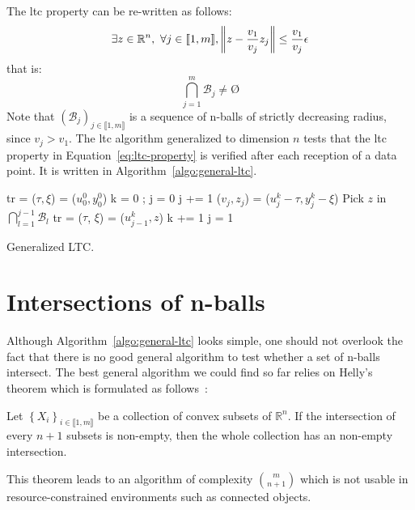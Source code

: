 The \acrshort{ltc} property can be re-written as follows:
\begin{equation}
\exists z \in \mathbb{R}^n, \ \forall j \in \llbracket 1, m \rrbracket, \norm{z-\frac{v_1}{v_j}z_j} \leq
\frac{v_1}{v_j}\epsilon
\end{equation}
that is:
\begin{equation}
\bigcap_{j=1}^m \mathcal{B}_j \neq \text{\O}
\label{eq:ltc-property}
\end{equation}
Note that $(\mathcal{B}_j)_{j \in \llbracket 1, m \rrbracket}$ is a sequence
of n-balls of strictly decreasing radius, since $v_j > v_1$.
The \acrshort{ltc} algorithm generalized to dimension $n$ tests that the
\acrshort{ltc} property in Equation~\ref{eq:ltc-property} is verified after each
reception of a data point. It is written in Algorithm~\ref{algo:general-ltc}.
\begin{algorithm}
\begin{algorithmic}[1]
\Input
\EndInput
\Output
\EndOutput

\State tr = ($\tau, \xi$) = ($u^0_0, y^0_0$) 
\State k = 0 ; j = 0
    \State j += 1
    \State ($v_j, z_j$) = ($u_j^k - \tau, y_j^k - \xi$)
        \State Pick $z$ in $\bigcap_{l=1}^{j-1}{\mathcal{B}_l}$ 
        \State tr = ($\tau$, $\xi$) = ($u^k_{j-1}, z$)
        \State k += 1
        \State j = 1
    \EndIf
\EndWhile
\end{algorithmic}
\caption{Generalized LTC.}
\label{algo:general-ltc}
\end{algorithm}

\section{Intersections of n-balls}

Although Algorithm~\ref{algo:general-ltc} looks simple, one should not overlook
the fact that there is no good general algorithm to test whether a set of
n-balls intersect. The best general algorithm we could find so far relies on
Helly's theorem which is formulated as follows~\cite{helly1923mengen}:
\begin{theorem}
Let $\left\{ X_i \right\}_{i \in \llbracket 1, m \rrbracket}$ be a collection of
convex subsets of $\mathbb{R}^n$. If the intersection of every $n+1$ subsets is
non-empty, then the whole collection has an non-empty intersection.
\end{theorem}
\noindent This theorem leads to an algorithm of complexity ${\binom{m}{n+1}}$
which is not usable in resource-constrained environments such as connected
objects.

